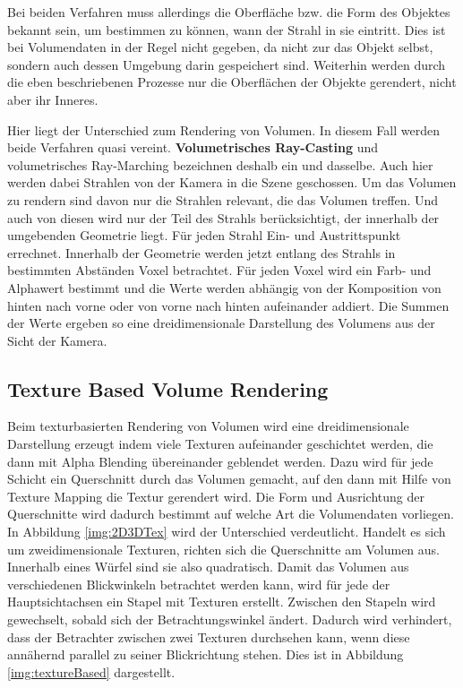 Bei beiden Verfahren muss allerdings die Oberfläche bzw. die Form des Objektes bekannt sein, um bestimmen zu können, wann der Strahl in sie eintritt. Dies ist bei Volumendaten in der Regel nicht gegeben, da nicht zur das Objekt selbst, sondern auch dessen Umgebung darin gespeichert sind. Weiterhin werden durch die eben beschriebenen Prozesse nur die Oberflächen der Objekte gerendert, nicht aber ihr Inneres.

Hier liegt der Unterschied zum Rendering von Volumen. In diesem Fall werden beide Verfahren quasi vereint. \textbf{Volumetrisches Ray-Casting} und volumetrisches Ray-Marching bezeichnen deshalb ein und dasselbe. Auch hier werden dabei Strahlen von der Kamera in die Szene geschossen. Um das Volumen zu rendern sind davon nur die Strahlen relevant, die das Volumen treffen. Und auch von diesen wird nur der Teil des Strahls berücksichtigt, der innerhalb der umgebenden Geometrie liegt. Für jeden Strahl Ein- und Austrittspunkt errechnet. Innerhalb der Geometrie werden jetzt entlang des Strahls in bestimmten Abständen Voxel betrachtet. Für jeden Voxel wird ein Farb- und Alphawert bestimmt und die Werte werden abhängig von der Komposition von hinten nach vorne oder von vorne nach hinten aufeinander addiert. Die Summen der Werte ergeben so eine dreidimensionale Darstellung des Volumens aus der Sicht der Kamera.

\subsection{Texture Based Volume Rendering}

Beim texturbasierten Rendering von Volumen wird eine dreidimensionale Darstellung erzeugt indem viele Texturen aufeinander geschichtet werden, die dann mit Alpha Blending übereinander geblendet werden. Dazu wird für jede Schicht ein Querschnitt durch das Volumen gemacht, auf den dann mit Hilfe von Texture Mapping die Textur gerendert wird.
Die Form und Ausrichtung der Querschnitte wird dadurch bestimmt auf welche Art die Volumendaten vorliegen. In Abbildung \ref{img:2D3DTex} wird der Unterschied verdeutlicht. Handelt es sich um zweidimensionale Texturen,  richten sich die Querschnitte am Volumen aus. Innerhalb eines Würfel sind sie also quadratisch. Damit das Volumen aus verschiedenen Blickwinkeln betrachtet werden kann, wird für jede der Hauptsichtachsen ein Stapel mit Texturen erstellt. Zwischen den Stapeln wird gewechselt, sobald sich der Betrachtungswinkel ändert. Dadurch wird verhindert, dass der Betrachter zwischen zwei Texturen durchsehen kann, wenn diese annähernd parallel zu seiner Blickrichtung stehen. Dies ist in Abbildung \ref{img:textureBased} dargestellt.

